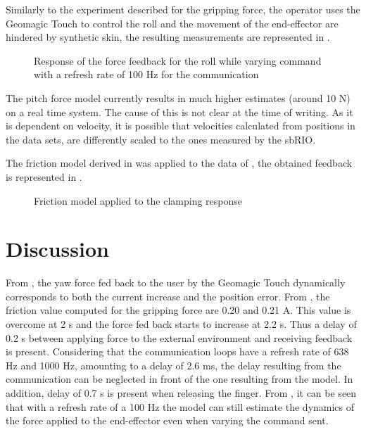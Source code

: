 Similarly to the experiment described for the gripping force, the operator uses the Geomagic Touch to control the roll and the movement of the end-effector are hindered by synthetic skin, the resulting measurements are represented in .
\begin{figure}[H]
  
  \caption{Response of the force feedback for the roll while varying command with a refresh rate of 100 Hz for the communication}
  \label{fig:fbkm_roll_100}
\end{figure}

The pitch force model currently results in much higher estimates (around 10 N) on a real time system. The cause of this is not clear at the time of writing. As it is dependent on velocity, it is possible that velocities calculated from positions in the data sets, are differently scaled to the ones measured by the sbRIO.


The friction model derived in  was applied to the data of , the obtained feedback is represented in .
\begin{figure}[H]

\caption{Friction model applied to the clamping response}
\label{fig:friction_validation}
\end{figure}


\section{Discussion}


From , the yaw force fed back to the user by the Geomagic Touch dynamically corresponds to both the current increase and the position error. From , the friction value computed for the gripping force are 0.20 and 0.21 A. This value is overcome at 2 s and the force fed back starts to increase at 2.2 s. Thus a delay of 0.2 s between applying force to the external environment and receiving feedback is present. Considering that the communication loops have a refresh rate of 638 Hz and 1000 Hz, amounting to a delay of 2.6 ms, the delay resulting from the communication can be neglected in front of the one resulting from the model. In addition, delay of 0.7 s is present when releasing the finger.
From , it can be seen that with a refresh rate of a 100 Hz the model can still estimate the dynamics of the force applied to the end-effector even when varying the command sent.

